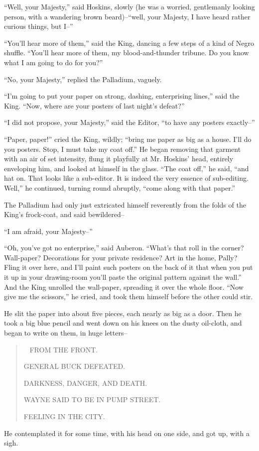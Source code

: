 \documentclass{book}
\newenvironment{mdblockquote}{%
  \begin{quotation}
    \
}{%
  \end{quotation}
}
\begin{document}
“Well, your Majesty,” said Hoskins, slowly (he was a worried, gentlemanly looking person, with a wandering brown beard)–“well, your Majesty, I have heard rather curious things, but I–”

“You’ll hear more of them,” said the King, dancing a few steps of a kind of Negro shuffle. “You’ll hear more of them, my blood-and-thunder tribune. Do you know what I am going to do for you?”

“No, your Majesty,” replied the Palladium, vaguely.

“I’m going to put your paper on strong, dashing, enterprising lines,” said the King. “Now, where are your posters of last night’s defeat?”

“I did not propose, your Majesty,” said the Editor, “to have any posters exactly–”

“Paper, paper!” cried the King, wildly; “bring me paper as big as a house. I’ll do you posters. Stop, I must take my coat off.” He began removing that garment with an air of set intensity, flung it playfully at Mr. Hoskins’ head, entirely enveloping him, and looked at himself in the glass. “The coat off,” he said, “and hat on. That looks like a sub-editor. It is indeed the very essence of sub-editing. Well,” he continued, turning round abruptly, “come along with that paper.”

The Palladium had only just extricated himself reverently from the folds of the King’s frock-coat, and said bewildered–

“I am afraid, your Majesty–”

“Oh, you’ve got no enterprise,” said Auberon. “What’s that roll in the corner? Wall-paper? Decorations for your private residence? Art in the home, Pally? Fling it over here, and I’ll paint such posters on the back of it that when you put it up in your drawing-room you’ll paste the original pattern against the wall.” And the King unrolled the wall-paper, spreading it over the whole floor. “Now give me the scissors,” he cried, and took them himself before the other could stir.

He slit the paper into about five pieces, each nearly as big as a door. Then he took a big blue pencil and went down on his knees on the dusty oil-cloth, and began to write on them, in huge letters–

\begin{mdblockquote}
	FROM THE FRONT.

	GENERAL BUCK DEFEATED.

	DARKNESS, DANGER, AND DEATH.

	WAYNE SAID TO BE IN PUMP STREET.

	FEELING IN THE CITY.


\end{mdblockquote}
He contemplated it for some time, with his head on one side, and got up, with a sigh.
\end{document}
